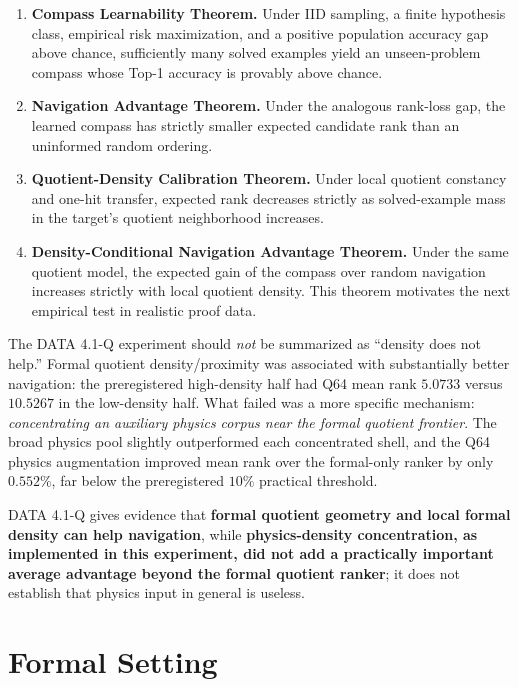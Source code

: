 \documentclass[11pt]{article}
\begin{document}
\begin{enumerate}[leftmargin=2.2em]
\item \textbf{Compass Learnability Theorem.} Under IID sampling, a finite hypothesis class, empirical risk maximization, and a positive population accuracy gap above chance, sufficiently many solved examples yield an unseen-problem compass whose Top-1 accuracy is provably above chance.
\item \textbf{Navigation Advantage Theorem.} Under the analogous rank-loss gap, the learned compass has strictly smaller expected candidate rank than an uninformed random ordering.
\item \textbf{Quotient-Density Calibration Theorem.} Under local quotient constancy and one-hit transfer, expected rank decreases strictly as solved-example mass in the target's quotient neighborhood increases.
\item \textbf{Density-Conditional Navigation Advantage Theorem.} Under the same quotient model, the expected gain of the compass over random navigation increases strictly with local quotient density. This theorem motivates the next empirical test in realistic proof data.
\end{enumerate}

The DATA 4.1-Q experiment should \emph{not} be summarized as ``density does not help.'' Formal quotient density/proximity was associated with substantially better navigation: the preregistered high-density half had Q64 mean rank $5.0733$ versus $10.5267$ in the low-density half. What failed was a more specific mechanism: \emph{concentrating an auxiliary physics corpus near the formal quotient frontier}. The broad physics pool slightly outperformed each concentrated shell, and the Q64 physics augmentation improved mean rank over the formal-only ranker by only $0.552\%$, far below the preregistered $10\%$ practical threshold.

\begin{tcolorbox}[colback=soft,colframe=accent,title=Safe one-sentence conclusion]
DATA 4.1-Q gives evidence that \textbf{formal quotient geometry and local formal density can help navigation}, while \textbf{physics-density concentration, as implemented in this experiment, did not add a practically important average advantage beyond the formal quotient ranker}; it does not establish that physics input in general is useless.
\end{tcolorbox}

\section{Formal Setting}
\end{document}
